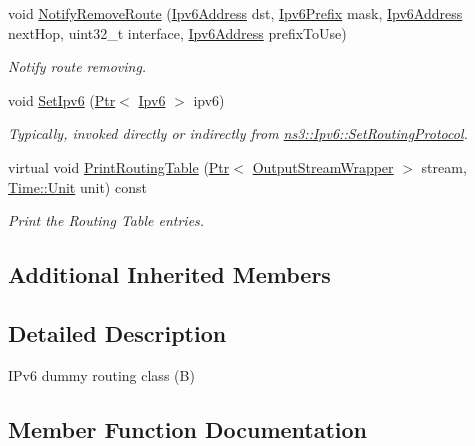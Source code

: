 \begin{DoxyCompactItemize}
void \hyperlink{classIpv6BRouting_a0f1bfdc03e55422dd39a22eac3d1748c}{Notify\+Remove\+Route} (\hyperlink{classns3_1_1Ipv6Address}{Ipv6\+Address} dst, \hyperlink{classns3_1_1Ipv6Prefix}{Ipv6\+Prefix} mask, \hyperlink{classns3_1_1Ipv6Address}{Ipv6\+Address} next\+Hop, uint32\+\_\+t interface, \hyperlink{classns3_1_1Ipv6Address}{Ipv6\+Address} prefix\+To\+Use)
\begin{DoxyCompactList}\small\item\em Notify route removing. \end{DoxyCompactList}\item 
void \hyperlink{classIpv6BRouting_af02c1868bf804683a45d2f4c4775c75f}{Set\+Ipv6} (\hyperlink{classns3_1_1Ptr}{Ptr}$<$ \hyperlink{classns3_1_1Ipv6}{Ipv6} $>$ ipv6)
\begin{DoxyCompactList}\small\item\em Typically, invoked directly or indirectly from \hyperlink{classns3_1_1Ipv6_aa889d2174527a1df773d65974de83f8f}{ns3\+::\+Ipv6\+::\+Set\+Routing\+Protocol}. \end{DoxyCompactList}\item 
virtual void \hyperlink{classIpv6BRouting_ad908ec5b086d92a81d827d7cb939c13b}{Print\+Routing\+Table} (\hyperlink{classns3_1_1Ptr}{Ptr}$<$ \hyperlink{classns3_1_1OutputStreamWrapper}{Output\+Stream\+Wrapper} $>$ stream, \hyperlink{classns3_1_1Time_a87a7f4d29c68b047a72d291ad660295a}{Time\+::\+Unit} unit) const 
\begin{DoxyCompactList}\small\item\em Print the Routing Table entries. \end{DoxyCompactList}\end{DoxyCompactItemize}
\subsection*{Additional Inherited Members}


\subsection{Detailed Description}
I\+Pv6 dummy routing class (B) 

\subsection{Member Function Documentation}
